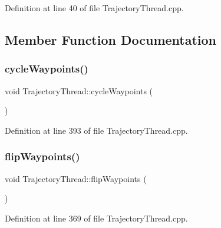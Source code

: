 Definition at line 40 of file Trajectory\+Thread.\+cpp.



\subsection{Member Function Documentation}
\hypertarget{classocra__recipes_1_1TrajectoryThread_a82672124920b0707e3b530d8826ce240}{}\label{classocra__recipes_1_1TrajectoryThread_a82672124920b0707e3b530d8826ce240} 
\subsubsection{\texorpdfstring{cycle\+Waypoints()}{cycleWaypoints()}}
{\footnotesize\ttfamily void Trajectory\+Thread\+::cycle\+Waypoints (\begin{DoxyParamCaption}{ }\end{DoxyParamCaption})\hspace{0.3cm}{\ttfamily [protected]}}



Definition at line 393 of file Trajectory\+Thread.\+cpp.

\hypertarget{classocra__recipes_1_1TrajectoryThread_aa7dfe52d95ee048e1e5fbf6ed7a820bd}{}\label{classocra__recipes_1_1TrajectoryThread_aa7dfe52d95ee048e1e5fbf6ed7a820bd} 
\subsubsection{\texorpdfstring{flip\+Waypoints()}{flipWaypoints()}}
{\footnotesize\ttfamily void Trajectory\+Thread\+::flip\+Waypoints (\begin{DoxyParamCaption}{ }\end{DoxyParamCaption})\hspace{0.3cm}{\ttfamily [protected]}}



Definition at line 369 of file Trajectory\+Thread.\+cpp.

\hypertarget{classocra__recipes_1_1TrajectoryThread_ade0f6fb6c7c139dc2f09398f1464200b}{}\label{classocra__recipes_1_1TrajectoryThread_ade0f6fb6c7c139dc2f09398f1464200b} 
